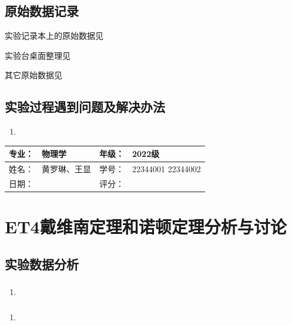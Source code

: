 \documentclass[dvipsnames, svgnames,a4paper,11pt]{article}
\begin{document}
	
	\clearpage
	\subsection{原始数据记录}
	实验记录本上的原始数据见%
	
	实验台桌面整理见%
	
	其它原始数据见%
	
	\subsection{实验过程遇到问题及解决办法}
	\begin{enumerate}
		\item 
	\end{enumerate}
	
	
	
	\clearpage
	
	\begin{table}
		\renewcommand\arraystretch{1.7}
		\begin{tabularx}{\textwidth}{|X|X|X|X|}
			\hline
			专业：& 物理学 &年级：& 2022级\\
			\hline
			姓名： & 黄罗琳、王显 & 学号：&22344001 22344002 \\
			\hline
			日期：&  & 评分： &\\
			\hline
		\end{tabularx}
	\end{table}
	
	\section{ET4戴维南定理和诺顿定理\quad\heiti 分析与讨论}
	
	\subsection{实验数据分析}
	
	\subsubsection{}
	\begin{enumerate}
		\item 
	\end{enumerate}
	
	\subsubsection{}
	\begin{enumerate}
		\item 
	\end{enumerate}
	
\end{document}

